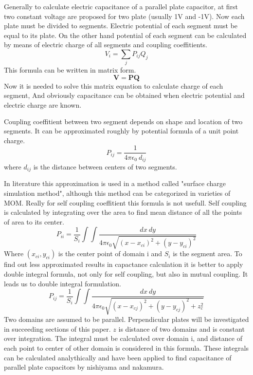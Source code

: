 \documentclass[twoside,twocolumn]{article}
\begin{document}
Generally to calculate electric capacitance of a parallel plate capacitor, at first two constant voltage are proposed for two plate (usually 1V and -1V). Now each plate must be divided to segments. Electric potential of each segment must be equal to its plate. On the other hand potential of each segment can be calculated by means of electric charge of all segments and coupling coeffitients.
\begin{equation}
\label{eq1}
V_i = \sum_j P_{ij} Q_j
\end{equation}
This formula can be written in matrix form.
\begin{equation}
\label{eq2}
\mathbf V = \mathbf P \mathbf Q
\end{equation}
 Now it is needed to solve this matrix equation to calculate charge of each segment, And obviously capacitance can be obtained when electric potential and electric charge are known.
 
Coupling coeffitient between two segment depends on shape and location of two segments. It can be approximated roughly by potential formula of a unit point charge. 
\begin{equation}
\label{eq3}
P_{ij} = \frac{1}{4 \pi \epsilon_0\  d_{ij}}
\end{equation}
where $d_{ij}$ is the distance between centers of two segments.


In literature this approximation is used in a method called "surface charge simulation method", although this method can be categorized in varieties of MOM. Really for self coupling coeffitient this formula is not usefull. Self coupling is calculated by integrating over the area to find mean distance of all the points of area to its center.
\begin{equation}
\label{eq4}
P_{ii} = \frac 1 {S_i} \int \int \frac {dx\  dy}{4 \pi \epsilon_0 \sqrt{(x-x_{ci})^2 + (y-y_{ci})^2}}
\end{equation}
Where $(x_{ci}, y_{ci})$ is the center point of domain i and $S_i $ is the segment area.
To find out less approximated results in capactance calculation it is better to apply double integral formula, not only for self coupling, but also in mutual coupling. It leads us to double integral formulation.
\begin{equation}
\label{eq5}
P_{ij} = \frac 1 {S_i}\int \int \frac {dx\  dy}{4 \pi \epsilon_0 \sqrt{(x-x_{cj})^2 + (y-y_{cj})^2+ z_c^2}}
\end{equation}
Two domains are assumed to be parallel. Perpendicular plates will be investigated in succeeding sections of this paper. $z$ is  distance of two domains and is constant over integration. The integral must be calculated over domain i, and distance of each point to center of other domain is considered in this formula. These integrals can be calculated analythically and have been applied to find capacitance of parallel plate capacitors by nishiyama and nakamura.
\end{document}

